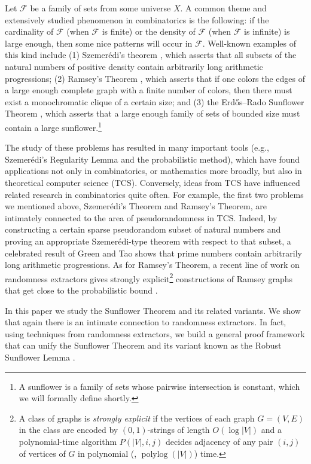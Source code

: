 \documentclass{toc}
\newcommand{\calF}{\mathcal{F}} %
\DeclareMathOperator{\polylog}{polylog}  %
\begin{document}
Let $\calF$ be a family of sets from some universe $X$. A common theme and extensively studied phenomenon in combinatorics is the
following: if the cardinality of $\calF$ (when $\calF$ is finite) or the density of $\calF$ (when $\calF$ is infinite) is
large enough, then some nice patterns will occur in $\calF$. Well-known examples of this kind include (1) Szemer\'{e}di's theorem
\cite{Szemerdi1975}, which asserts that all subsets of the natural numbers of positive density contain arbitrarily long arithmetic progressions; (2)
Ramsey's Theorem \cite{ErdosS1935}, which asserts that if one colors the edges of a large enough complete graph with a finite number of colors, then
there must exist a monochromatic clique of a certain size; and (3) the Erd\H{o}s--Rado Sunflower Theorem \cite{ErdosR1960}, which asserts that a large
enough family of sets of bounded size must contain a large sunflower.\footnote{A sunflower is a family of sets whose
pairwise intersection is constant, which we will formally define shortly.}

The study of these problems has resulted in many important tools (e.g., Szemer\'{e}di's Regularity Lemma \cite{Szemerdi1978}
%
and the probabilistic
method), which have found applications not only in combinatorics, or mathematics more broadly, but also in
theoretical %
computer science (TCS). %
Conversely, ideas from %
TCS   %
have
influenced related research in combinatorics quite often. For example, the first two problems we mentioned above, Szemer\'{e}di's Theorem and
Ramsey's Theorem, are intimately connected to the area of
pseudorandomness in %
TCS.   %
Indeed, by constructing a certain sparse
pseudorandom subset of natural numbers and proving an appropriate Szemer\'{e}di-type theorem with respect to that subset, a celebrated result of
Green and Tao \cite{GreenT2008} shows that prime numbers contain arbitrarily long arithmetic progressions. As for Ramsey's Theorem, a recent line of
work on randomness extractors \cite{barak2005simulating,Li15,CZ16,BDT17,Cohen17,Li17} %
gives  %
%
strongly  %
%
explicit\footnote{\label{footnote:explicit}%
A class of graphs is \emph{strongly explicit}
if the vertices of each graph $G=(V,E)$ in the class
are encoded by $(0,1)$-strings of length $O(\log |V|)$
and a polynomial-time algorithm $P(|V|,i,j)$ decides
adjacency of any pair $(i,j)$ of vertices of $G$ in
polynomial (\ie, $\polylog(|V|)$) time.}
%
%
%
%
%
constructions of Ramsey graphs that
%
get close to %
the probabilistic bound \cite{Erdos1947}.

In this paper we study the Sunflower Theorem and its related variants. We show that again there is an intimate connection to randomness extractors.
In fact, using techniques from randomness extractors, we build a general proof framework that can unify the Sunflower Theorem and its variant
known as the Robust Sunflower Lemma \cite{rossman2010monotone}.
\end{document}
